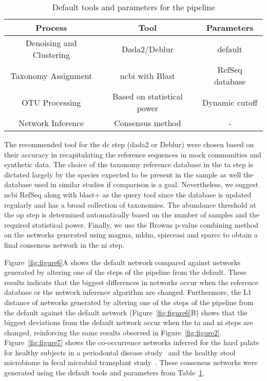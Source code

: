   \begin{table}[h]
    \centering
    \small
    \begin{tabular}{|c|c|c|}
      \hline
      \textbf{Process} & \textbf{Tool} & \textbf{Parameters} \\
      \hline
      Denoising and Clustering & Dada2/Deblur & default \\
      Taxonomy Assignment & \ac{ncbi} with Blast & RefSeq database \\
      OTU Processing & Based on statistical power & Dynamic cutoff \\
      Network Inference & Consensus method & - \\
      \hline
    \end{tabular}
    \caption{Default tools and parameters for the pipeline}
    \label{tab:default_options}
  \end{table}

  The recommended tool for the \ac{dc} step (\ac{dada2} or Deblur) were chosen based on their accuracy in recapitulating the reference sequences in mock communities and synthetic data.
  The choice of the taxonomy reference database in the \ac{ta} step is dictated largely by the species expected to be present in the sample as well the database used in similar studies if comparison is a goal.
  Nevertheless, we suggest \ac{ncbi} RefSeq along with blast+ as the query tool since the database is updated regularly and has a broad collection of taxonomies.
  The abundance threshold at the \ac{op} step is determined automatically based on the number of samples and the required statistical power.
  Finally, we use the Browns p-value combining method on the networks generated using \ac{magma}, \ac{mldm}, \ac{spieceasi} and \ac{sparcc} to obtain a final consensus network in the \ac{ni} step.

  Figure~\ref{fig:figure6}A shows the default network compared against networks generated by altering one of the steps of the pipeline from the default.
  These results indicate that the biggest differences in networks occur when the reference database or the network inference algorithm are changed.
  Furthermore, the L1 distance of networks generated by altering one of the steps of the pipeline from the default against the default network (Figure~\ref{fig:figure6}B) shows that the biggest deviations from the default network occur when the \ac{ta} and \ac{ni} steps are changed, reinforcing the same results observed in Figure~\ref{fig:figure2}. Figure~\ref{fig:figure7} shows the co-occurrence networks inferred for the hard palate for healthy subjects in a periodontal disease study~\cite{Chen2018} and the healthy stool microbiome in fecal microbial transplant study~\cite{Kang2017}. These consensus networks were generated using the default tools and parameters from Table~\ref{tab:default_options}.

